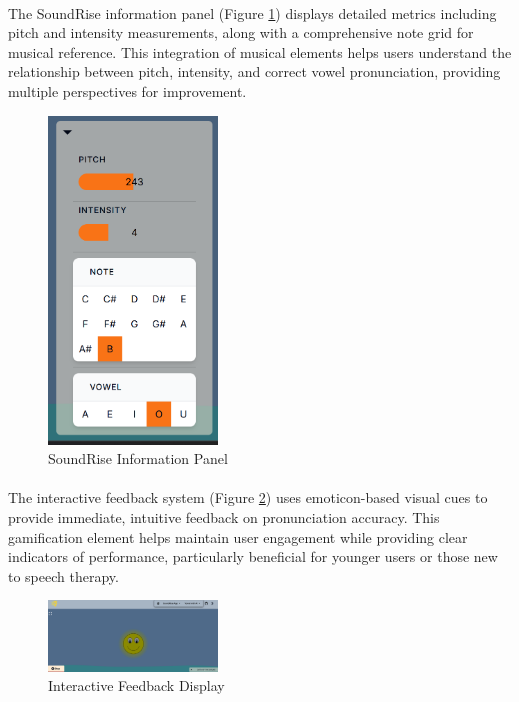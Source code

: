 \paragraph{}
The SoundRise information panel (Figure \ref{fig:info}) displays detailed metrics including pitch and intensity measurements, along with a comprehensive note grid for musical reference. This integration of musical elements helps users understand the relationship between pitch, intensity, and correct vowel pronunciation, providing multiple perspectives for improvement.

\begin{figure}[htbp]
    \centering
    \includegraphics[width=0.4\textwidth]{res/images/webapp/soundRise-info.png}
    \caption{SoundRise Information Panel}
    \label{fig:info}
\end{figure}

\paragraph{}
The interactive feedback system (Figure \ref{fig:feedback}) uses emoticon-based visual cues to provide immediate, intuitive feedback on pronunciation accuracy. This gamification element helps maintain user engagement while providing clear indicators of performance, particularly beneficial for younger users or those new to speech therapy.

\begin{figure}[htbp]
    \centering
    \includegraphics[width=0.4\textwidth]{res/images/webapp/soundRise-1.png}
    \caption{Interactive Feedback Display}
    \label{fig:feedback}
\end{figure}

